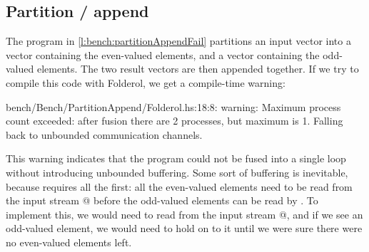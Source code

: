 \subsection{Partition / append}

The program in \cref{l:bench:partitionAppendFail} partitions an input vector into a vector containing the even-valued elements, and a vector containing the odd-valued elements.
The two result vectors are then appended together.
If we try to compile this code with Folderol, we get a compile-time warning:

% 

\begin{code}
bench/Bench/PartitionAppend/Folderol.hs:18:8: warning:
  Maximum process count exceeded:
    after fusion there are 2 processes, but maximum is 1.
  Falling back to unbounded communication channels.
\end{code}

This warning indicates that the program could not be fused into a single loop without introducing unbounded buffering.
Some sort of buffering is inevitable, because \Hs@append@ requires all the \Hs@evens@ first: all the even-valued elements need to be read from the input stream @ before the odd-valued elements can be read by \Hs@append@.
To implement this, we would need to read from the input stream @, and if we see an odd-valued element, we would need to hold on to it until we were sure there were no even-valued elements left.

